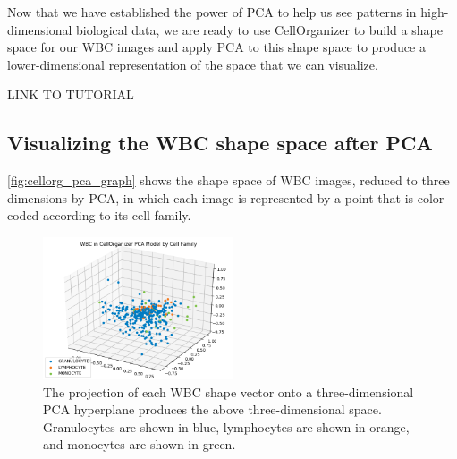 Now that we have established the power of PCA to help us see patterns in high-dimensional biological data, we are ready to use CellOrganizer to build a shape space for our WBC images and apply PCA to this shape space to produce a lower-dimensional representation of the space that we can visualize.

LINK TO TUTORIAL

\begin{note}\end{note}

\FloatBarrier
{}
\subsection{Visualizing the WBC shape space after PCA}

\autoref{fig:cellorg_pca_graph} shows the shape space of WBC images, reduced to three dimensions by PCA, in which each image is represented by a point that is color-coded according to its cell family.\\

\begin{figure}[h]
\centering
\mySfFamily
\includegraphics[width = 0.5\textwidth]{../images/cellorg_pca_graph.png}
\caption{The projection of each WBC shape vector onto a three-dimensional PCA hyperplane produces the above three-dimensional space. Granulocytes are shown in blue, lymphocytes are shown in orange, and monocytes are shown in green.}
\label{fig:cellorg_pca_graph}
\end{figure}

